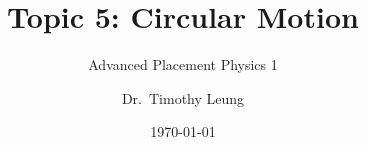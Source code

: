 \documentclass[12pt,compress,aspectratio=169]{beamer}
\title{Topic 5: Circular Motion}
\subtitle{Advanced Placement Physics 1}
\author[TML]{Dr.\ Timothy Leung}
\institute{Olympiads School}
\date{\today}
\begin{document}
\begin{frame}
  \maketitle
\end{frame}
%
%
%
%
%
%
%
%
%
\end{document}

